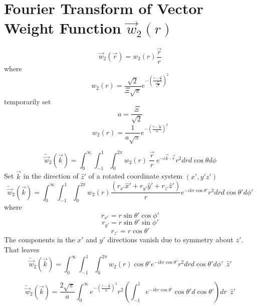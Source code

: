 \documentclass[double,12pt]{beavtex}
\begin{document}
\section{Fourier Transform of Vector Weight Function $\vec{w}_{2}(r)$}
\begin{equation}{\vec{w}_2(\vec{r})=w_2(r)\frac{\vec{r}}{r}}\end{equation}
where
\begin{equation}{w_2(r)=\frac{\sqrt{2}}{\Xi\sqrt{\pi}}e^{-\left(\frac{r-\frac{\alpha}{2}}{\frac{\Xi}{\sqrt{2}}}\right)^2}}\end{equation}
temporarily set 
\begin{equation}{a=\frac{\Xi}{\sqrt{2}}}\end{equation}
\begin{equation}{w_2(r)=\frac{1}{a\sqrt{\pi}}e^{-\left(\frac{r-\frac{\alpha}{2}}{a}\right)^2}}\end{equation}

\begin{equation}{\widetilde{\vec{w}}_2(\vec{k})=\int_{0}^{\infty}\int_{-1}^{1}\int_{0}^{2\pi}w_2(r){~}\frac{\vec{r}}{r}{~}e^{-i\vec{k}\cdot{\vec{r}}}r^2d{r}d{\cos\theta}d{\phi}}\end{equation}
Set $\vec{k}$ in the direction of $\hat{z}'$ of a rotated coordinate 
system $(x',y'z')$ 
\begin{equation}{\widetilde{\vec{w}}_2(\vec{k})=\int_{0}^{\infty}\int_{-1}^{1}\int_{0}^{2\pi}w_2(r)\frac{(r_{x'}\hat{x}'+r_{y'}\hat{y}'+r_{z'}\hat{z}')}{r}e^{-ikr\cos\theta'}r^2d{r}d{\cos\theta'}d{\phi'}}\end{equation}
where 
\begin{displaymath}{r_{x'}=r\sin\theta'\cos\phi'}\end{displaymath}
\begin{displaymath}{r_{y'}=r\sin\theta'\sin\phi'}\end{displaymath}
\begin{displaymath}{r_{z'}=r\cos\theta'}\end{displaymath} 
The components in the $x'$ and $y'$ directions vanish due to symmetry 
about $z'$. That leaves
\begin{equation}{\widetilde{\vec{w}}_2(\vec{k})=\int_{0}^{\infty}\int_{-1}^{1}\int_{0}^{2\pi}w_2(r)\cos{\theta}'e^{-ikr\cos\theta'}r^2d{r}d{\cos\theta'}d{\phi'}{~~}\hat{z}'}\end{equation}

\begin{equation}{\widetilde{\vec{w}}_2(\vec{k})=\frac{2\sqrt{\pi}}{a}\int_{0}^{\infty}e^{-\left(\frac{r-\frac{\alpha}{2}}{a}\right)^2}r^2\left(\int_{-1}^{1}e^{-ikr\cos\theta'}\cos{\theta}'d{\cos\theta'}\right)d{r}{~~}\hat{z}'}\end{equation}
\end{document}
